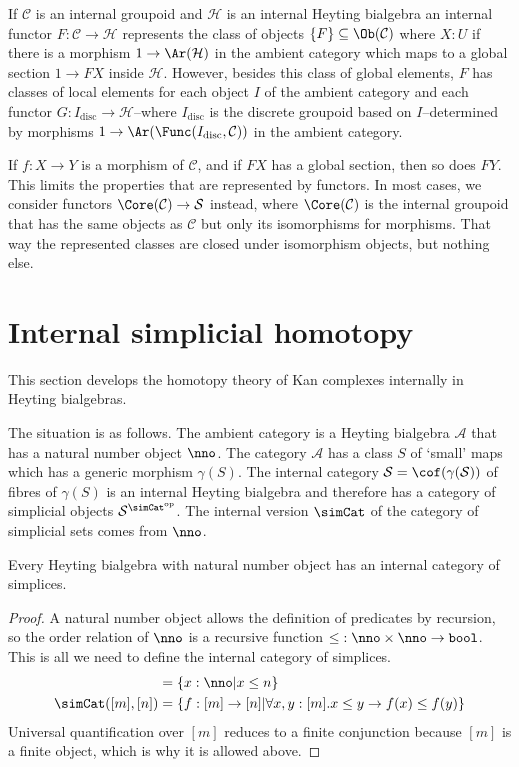\documentclass{tac}
\newcommand\cat\mathcal
\newcommand\set[1]{\left\{#1\right\}}
\newcommand\dual{^{\mathrm{op}}}
\newcommand\disc{_{\mathrm{disc}}}
\newcommand\s{^{\simCat\dual}}
\newcommand\of{:}
\newcommand\gen\gamma
\newcommand\bool{\mathtt{bool}}
\begin{document}
If $\cat C$ is an internal groupoid and $\cat H$ is an internal Heyting bialgebra an internal functor $F\of\cat C\to\cat H$ represents the class of objects $\set F\subseteq \Ob(\cat C)$ where $X\of U$ if there is a morphism $1\to\Ar(\cat H)$ in the ambient category which maps to a global section $1\to FX$ inside $\cat H$. However, besides this class of global elements, $F$ has classes of local elements for each object $I$ of the ambient category and each functor $G\of I\disc \to \cat H$--where $I\disc$ is the discrete groupoid based on $I$--determined by morphisms $1\to\Ar(\Func(I\disc,\cat C))$ in the ambient category.

If $f\of X\to Y$ is a morphism of $\cat C$, and if $FX$ has a global section, then so does $FY$. This limits the properties that are represented by functors. In most cases, we consider functors $\Core(\cat C)\to \cat S$ instead, where $\Core(\cat C)$ is the internal groupoid that has the same objects as $\cat C$ but only its isomorphisms for morphisms. That way the represented classes are closed under isomorphism objects, but nothing else.

\section{Internal simplicial homotopy}
This section develops the homotopy theory of Kan complexes internally in Heyting bialgebras. 

The situation is as follows. The ambient category is a Heyting bialgebra $\cat A$ that has a natural number object $\nno$. The category $\cat A$ has a class $S$ of `small' maps which has a generic morphism $\gen(S)$. The internal category $\cat S = \cof(\gen(\cat S))$ of fibres of $\gen(S)$ is an internal Heyting bialgebra and therefore has a category of simplicial objects $\cat S\s$. The internal version $\simCat$ of the category of simplicial sets comes from $\nno$.

\begin{proposition} Every Heyting bialgebra with natural number object has an internal category of simplices.\end{proposition}

\begin{proof} A natural number object allows the definition of predicates by recursion, so the order relation of $\nno$ is a recursive function $\mathord\leq\of\nno\times \nno \to \bool$. This is all we need to define the internal category of simplices.
\begin{align*}
[n] &= \set{x\of\nno\middle| x\leq n}\\
\simCat([m],[n]) &= \set{f\of[m]\to[n]\middle|\forall x,y\of [m].x\leq y\to f(x)\leq f(y)}
\end{align*}
Universal quantification over $[m]$ reduces to a finite conjunction because $[m]$ is a finite object, which is why it is allowed above. 
\end{proof}
\end{document}
